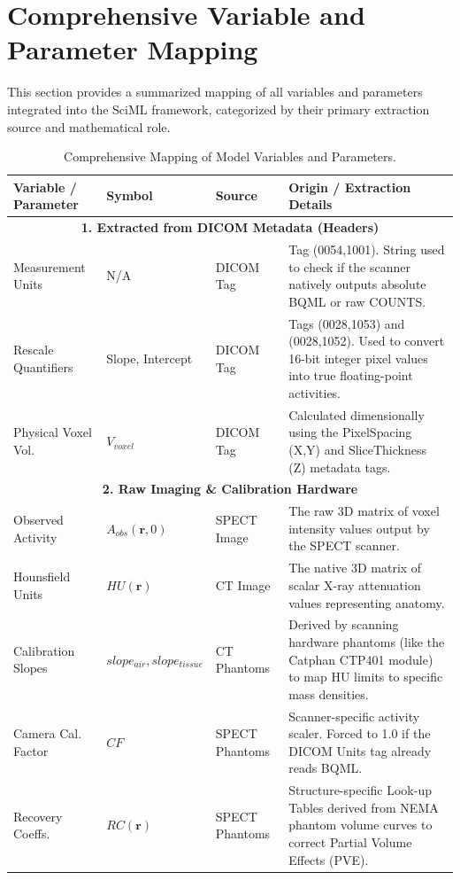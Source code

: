 \documentclass[11pt,a4paper]{article}
\begin{document}
\section{Comprehensive Variable and Parameter Mapping}
This section provides a summarized mapping of all variables and parameters integrated into the SciML framework, categorized by their primary extraction source and mathematical role.

\begin{table}[h!]
\centering
\caption{Comprehensive Mapping of Model Variables and Parameters.}
\label{tab:variables_mapping}
\scriptsize
\begin{tabularx}{\textwidth}{@{}l l l X@{}}
\toprule
\textbf{Variable / Parameter} & \textbf{Symbol} & \textbf{Source} & \textbf{Origin / Extraction Details} \\ \midrule
\multicolumn{4}{c}{\textbf{1. Extracted from DICOM Metadata (Headers)}} \\ \midrule
Measurement Units & N/A & DICOM Tag & Tag (0054,1001). String used to check if the scanner natively outputs absolute BQML or raw COUNTS. \\
Rescale Quantifiers & Slope, Intercept & DICOM Tag & Tags (0028,1053) and (0028,1052). Used to convert 16-bit integer pixel values into true floating-point activities. \\
Physical Voxel Vol. & $V_{voxel}$ & DICOM Tag & Calculated dimensionally using the PixelSpacing (X,Y) and SliceThickness (Z) metadata tags. \\ \midrule
\multicolumn{4}{c}{\textbf{2. Raw Imaging \& Calibration Hardware}} \\ \midrule
Observed Activity & $A_{obs}(\mathbf{r}, 0)$ & SPECT Image & The raw 3D matrix of voxel intensity values output by the SPECT scanner. \\
Hounsfield Units & $HU(\mathbf{r})$ & CT Image & The native 3D matrix of scalar X-ray attenuation values representing anatomy. \\
Calibration Slopes & $slope_{air}, slope_{tissue}$ & CT Phantoms & Derived by scanning hardware phantoms (like the Catphan CTP401 module) to map HU limits to specific mass densities. \\
Camera Cal. Factor & $CF$ & SPECT Phantoms & Scanner-specific activity scaler. Forced to 1.0 if the DICOM Units tag already reads BQML. \\
Recovery Coeffs. & $RC(\mathbf{r})$ & SPECT Phantoms & Structure-specific Look-up Tables derived from NEMA phantom volume curves to correct Partial Volume Effects (PVE). \\ \midrule

\end{tabularx}
\end{table}
\end{document}
